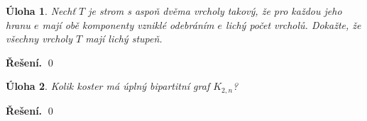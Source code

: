 \documentclass{article}
\newtheorem{uloha}{Úloha}
\newenvironment{reseni}{\noindent\textbf{Řešení.}\hspace{0.5em}}{\hfill\qed\medskip}
\begin{document}
\begin{uloha}
Nechť $T$ je strom s aspoň dvěma vrcholy takový, že pro každou jeho hranu $e$ mají obě komponenty vzniklé odebráním $e$ lichý počet vrcholů. Dokažte, že všechny vrcholy $T$ mají lichý stupeň.
\end{uloha}
\begin{reseni}
\end{reseni}
\begin{uloha}
Kolik koster má úplný bipartitní graf $K_{2,n}$?
\end{uloha}
\begin{reseni}
\end{reseni}
\end{document}
